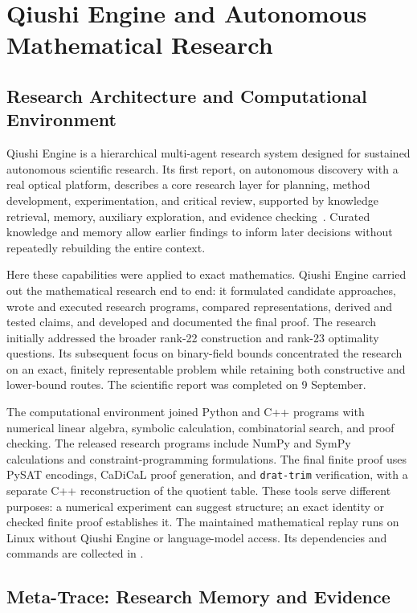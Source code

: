 \section{Qiushi Engine and Autonomous Mathematical Research}\label{sec:research}

\subsection{Research Architecture and Computational Environment}

Qiushi Engine is a hierarchical multi-agent research system designed for
sustained autonomous scientific research. Its first
report, on autonomous discovery with a real optical platform, describes
a core research layer for planning, method development, experimentation,
and critical review, supported by knowledge retrieval, memory, auxiliary
exploration, and evidence checking~\cite{yang2026optical}. Curated knowledge
and memory allow earlier findings to inform later decisions without
repeatedly rebuilding the entire context.

Here these capabilities were applied to exact mathematics. Qiushi Engine
carried out the mathematical research end to end: it formulated candidate
approaches, wrote and executed research programs, compared representations,
derived and tested claims, and developed and documented the final proof.
The research initially addressed the broader rank-22 construction and
rank-23 optimality questions. Its subsequent
focus on binary-field bounds concentrated the research on an exact,
finitely representable problem while retaining both constructive and
lower-bound routes. The scientific report was completed on 9 September.

The computational environment joined Python and C++ programs with
numerical linear algebra, symbolic calculation, combinatorial search,
and proof checking. The released research programs include NumPy and
SymPy calculations and constraint-programming formulations. The final
finite proof uses PySAT encodings, CaDiCaL proof generation, and
\texttt{drat-trim} verification, with a separate C++ reconstruction of
the quotient table. These tools serve different purposes: a numerical
experiment can suggest structure; an exact identity or checked finite
proof establishes it. The maintained mathematical replay runs on Linux
without Qiushi Engine or language-model access. Its dependencies and
commands are collected in .

\subsection{Meta-Trace: Research Memory and Evidence}

